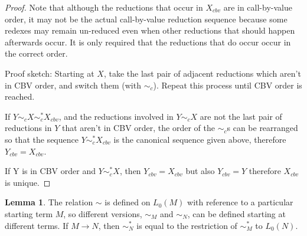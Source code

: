 \documentclass{article}
\theoremstyle{definition}
\theoremstyle{lemma}
\newtheorem{lemma}{Lemma}
\theoremstyle{remark}
\begin{document}
\begin{proof}
Note that although the reductions that occur in $X_{cbv}$ are in call-by-value order, it may not be the actual call-by-value reduction sequence because some redexes may remain un-reduced even when other reductions that should happen afterwards occur. It is only required that the reductions that do occur occur in the correct order.

Proof sketch:
Starting at $X$, take the last pair of adjacent reductions which aren't in CBV order, and switch them (with $\sim_c$). Repeat this process until CBV order is reached.

If $Y \sim_c X \sim_c^* X_{cbv}$, and the reductions involved in $Y \sim_c X$ are not the last pair of reductions in $Y$ that aren't in CBV order, the order of the $\sim_c$s can be rearranged so that the sequence $Y \sim_c^* X_{cbv}$ is the canonical sequence given above, therefore $Y_{cbv} = X_{cbv}$.

If Y is in CBV order and $Y \sim_c^* X$, then $Y_{cbv} = X_{cbv}$ but also $Y_{cbv} = Y$ therefore $X_{cbv}$ is unique.
\end{proof}

\begin{lemma}
\label{lem:sim-M-N}
The relation $\sim$ is defined on $L_0(M)$ with reference to a particular starting term $M$, so different versions, $\sim_M$ and $\sim_N$, can be defined starting at different terms. If $M \to N$, then $\sim^*_N$ is equal to the restriction of $\sim^*_M$ to $L_0(N)$.
\end{lemma} 
\end{document}
